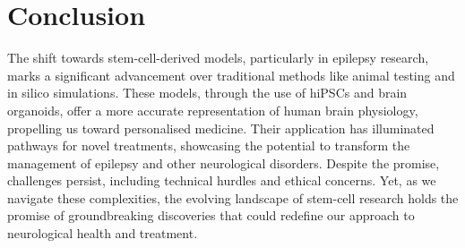 \documentclass[10pt]{article}
\begin{document}
\begin{sloppypar}
  \section{Conclusion}
  \label{sec:conclusion}

  The shift towards stem-cell-derived models, particularly in epilepsy research, marks a significant advancement over traditional methods like animal testing and in silico simulations. These models, through the use of hiPSCs and brain organoids, offer a more accurate representation of human brain physiology, propelling us toward personalised medicine. Their application has illuminated pathways for novel treatments, showcasing the potential to transform the management of epilepsy and other neurological disorders. Despite the promise, challenges persist, including technical hurdles and ethical concerns. Yet, as we navigate these complexities, the evolving landscape of stem-cell research holds the promise of groundbreaking discoveries that could redefine our approach to neurological health and treatment.


  \pagebreak
  
  

\end{sloppypar}
\end{document}
